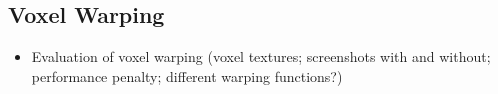\subsection{Voxel Warping}


\begin{itemize}
    \item Evaluation of voxel warping (voxel textures; screenshots with and without; performance penalty; different warping functions?)
\end{itemize}

